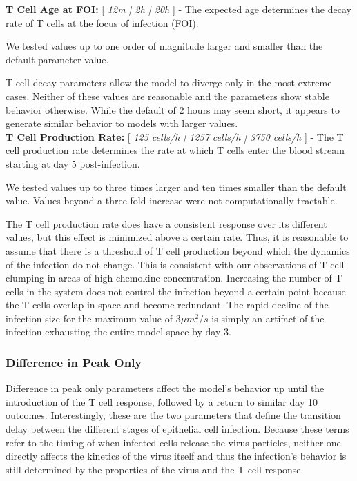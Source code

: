 \documentclass[preprint,10pt,authoryear]{article}
\begin{document}
\textbf{T Cell Age at FOI:} [ \textit{12m | 2h | 20h} ] - The expected age determines the decay rate of T cells at the focus of infection (FOI).  

We tested values up to one order of magnitude larger and smaller than the default parameter value.

T cell decay parameters allow the model to diverge only in the most extreme cases.  Neither of these values are reasonable and the parameters show stable behavior otherwise.  While the default of 2 hours may seem short, it appears to generate similar behavior to models with larger values. \\


\textbf{T Cell Production Rate:} [ \textit{125 cells/h | 1257 cells/h | 3750 cells/h} ] - The T cell production rate determines the rate at which T cells enter the blood stream starting at day 5 post-infection.

We tested values up to three times larger and ten times smaller than the default value.  Values beyond a three-fold increase were not computationally tractable.

The T cell production rate does have a consistent response over its different values, but this effect is minimized above a certain rate.  Thus, it is reasonable to assume that there is a threshold of T cell production beyond which the dynamics of the infection do not change.  This is consistent with our observations of T cell clumping in areas of high chemokine concentration.  Increasing the number of T cells in the system does not control the infection beyond a certain point because the T cells overlap in space and become redundant.  The rapid decline of the infection size for the maximum value of $3 \mu m^2/s$ is simply an artifact of the infection exhausting the entire model space by day 3.


\subsubsection{Difference in Peak Only} 

Difference in peak only parameters affect the model's behavior up until the introduction of the T cell response, followed by a return to similar day 10 outcomes.  Interestingly, these are the two parameters that define the transition delay between the different stages of epithelial cell infection. Because these terms refer to the timing of when infected cells release the virus particles, neither one directly affects the kinetics of the virus itself and thus the infection's behavior is still determined by the properties of the virus and the T cell response. \\
\end{document}
